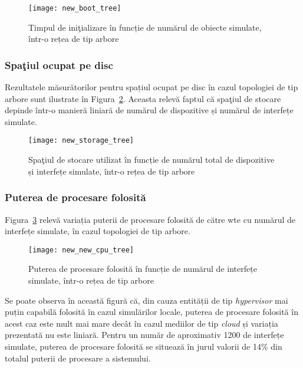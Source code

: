\begin{figure}[h]
	\centering
	\texttt{[image: new\_boot\_tree]}
	\caption{Timpul de iniţializare în funcție de numărul de obiecte simulate, într-o rețea de tip arbore}
	\label{fig:new_boot_tree}
\end{figure}

\subsubsection{Spaţiul ocupat pe disc}

Rezultatele măsurătorilor pentru spațiul ocupat pe disc în cazul topologiei de tip arbore sunt ilustrate în Figura~\ref{fig:new_storage_tree}. Aceasta relevă faptul că spaţiul de stocare depinde într-o manieră liniară de numărul de dispozitive și numărul de interfețe simulate. 

\begin{figure}[h]
	\centering
	\texttt{[image: new\_storage\_tree]}
	\caption{Spaţiul de stocare utilizat în funcție de numărul total de dispozitive și interfețe simulate, într-o rețea de tip arbore}
	\label{fig:new_storage_tree}
\end{figure}

\subsubsection{Puterea de procesare folosită}

Figura~\ref{fig:new_cpu_tree} relevă variația puterii de procesare folosită de către \gls{wte} cu numărul de interfețe simulate, în cazul topologiei de tip arbore.

\begin{figure}[h]
	\centering
	\texttt{[image: new\_new\_cpu\_tree]}
	\caption{Puterea de procesare folosită în funcție de numărul de interfețe simulate, într-o rețea de tip arbore}
	\label{fig:new_cpu_tree}
\end{figure}

Se poate observa în această figură că, din cauza entității de tip \textit{hypervisor} mai puțin capabilă folosită în cazul simulărilor locale, puterea de procesare folosită în acest caz este mult mai mare decât în cazul mediilor de tip \textit{cloud} și variația prezentată nu este liniară. Pentru un număr de aproximativ 1200 de interfețe simulate, puterea de procesare folosită se situează în jurul valorii de 14\% din totalul puterii de procesare a sistemului.


